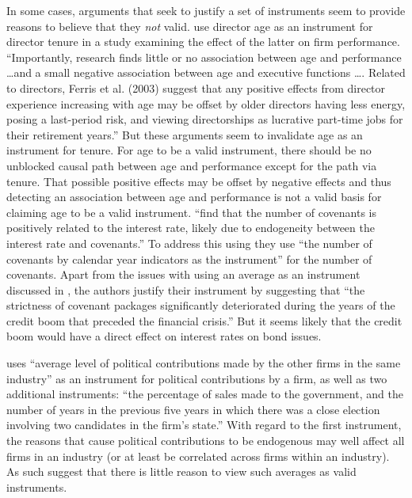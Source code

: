 \documentclass[11pt]{amsart}
\begin{document}
In some cases, arguments that seek to justify a set of instruments seem to provide reasons to believe that they \emph{not} valid. \citet{Kim:2014fm} use director age as an instrument for director tenure in a study examining the effect of the latter on firm performance. 
``Importantly, research finds little or no association between age and performance \dots and a small negative association between age and executive functions \dots. 
Related to directors, Ferris et al. (2003) suggest that any positive effects from director experience increasing with age may be offset by older directors having less energy, posing a last-period risk, and viewing directorships as lucrative part-time jobs for their retirement years.'' 
But these arguments seem to invalidate age as an instrument for tenure. 
For age to be a valid instrument, there should be no unblocked causal path between age and performance except for the path via tenure.
 That possible positive effects may be offset by negative effects and thus detecting an association between age and performance is not a valid basis for claiming age to be a valid instrument. \citet{deFranco:2014ct} ``find that the number of covenants is positively related to the interest rate, likely due to endogeneity between the interest rate and covenants.'' To address this using they use ``the number of covenants by calendar year indicators as the instrument'' for the number of covenants. Apart from the issues with using an average as an instrument discussed in \citet{Reiss:2007ej}, the authors justify their instrument by suggesting that ``the strictness of covenant packages significantly deteriorated during the years of the credit boom that preceded the financial crisis.'' But it seems likely that the credit boom would have a direct effect on interest rates on bond issues. 
 
\citet{Correia:2014fp} uses ``average level of political contributions made by the other firms in the same industry'' as an instrument for political contributions by a firm, as well as two additional instruments: ``the percentage of sales made to the government, and the number of years in the previous five years in which there was a close election involving two candidates in the firm's state.'' With regard to the first instrument, the reasons that cause political contributions to be endogenous may well affect all firms in an industry (or at least be correlated across firms within an industry). 
As such \citet{Reiss:2007ej} suggest that there is little reason to view such averages as valid instruments.
\end{document}
